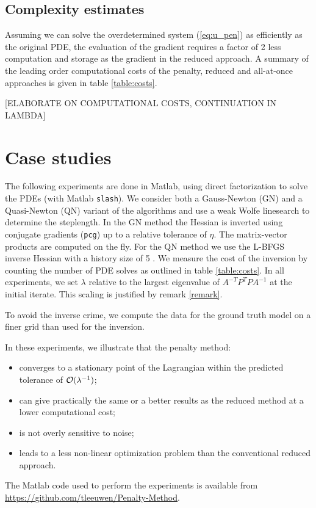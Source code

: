 \documentclass{iopart}
\begin{document}
\subsection{Complexity estimates}
Assuming we can solve the overdetermined system (\ref{eq:u_pen}) as efficiently as
the original PDE, the evaluation of the gradient requires a factor of 2 less
computation and storage as the gradient in the reduced approach. 
A summary of the leading order computational costs of the penalty, reduced and all-at-once approaches is given in table \ref{table:costs}.

[ELABORATE ON COMPUTATIONAL COSTS, CONTINUATION IN LAMBDA]

\section{Case studies}
\label{examples}
The following experiments are done in Matlab, using direct factorization to solve the PDEs (with Matlab \texttt{slash}). We consider both a Gauss-Newton (GN) and a Quasi-Newton (QN) variant of the algorithms and use a weak Wolfe linesearch to determine the steplength. In the GN method the Hessian is inverted using conjugate gradients (\texttt{pcg}) up to a relative tolerance of $\eta$. The matrix-vector products are computed on the fly. For the QN method we use the L-BFGS inverse Hessian with a history size of 5 \cite{Nocedal}. We measure the cost of the inversion by counting the number of PDE solves as outlined in table \ref{table:costs}. In all experiments, we set $\lambda$ relative to the largest eigenvalue of $A^{-T}P^T\!PA^{-1}$ at the initial iterate. This scaling is justified by remark \ref{remark}.

To avoid the inverse crime, we compute the data for the ground truth model on a finer grid than used for the inversion. 

In these experiments, we illustrate that the penalty method: 
\begin{itemize}
\item converges to a stationary point of the Lagrangian within the predicted tolerance of $\mathcal{O}(\lambda^{-1})$;
\item can give practically the same or a better results as the reduced method at a lower computational cost;
\item is not overly sensitive to noise;
\item leads to a less non-linear optimization problem than the conventional reduced approach.
\end{itemize}
The Matlab code used to perform the experiments is available from \url{https://github.com/tleeuwen/Penalty-Method}.
\end{document}
